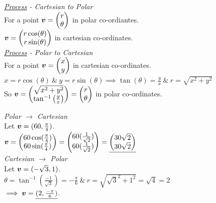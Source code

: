 \documentclass[11pt,a4paper]{article}
\begin{document}
\textit{\underline{Process} - Cartesian to Polar}\\
For a point $\boldsymbol{v} = \begin{pmatrix}r \\ \theta\end{pmatrix}$ in polar co-ordiantes.\\
$\boldsymbol{v} = \begin{pmatrix} r\cos(\theta) \\ r\sin(\theta) \end{pmatrix}$ in cartesian co-ordinates.\\

\textit{\underline{Process} - Polar to Cartesian}\\
For a point $\boldsymbol{v} = \begin{pmatrix} x \\ y \end{pmatrix}$ in cartesian co-ordinates.\\
\-\hspace{2em}$x=r\cos(\theta)\ \& \ y=r\sin(\theta) \implies \tan(\theta) = \frac{y}{x}\ \&\ r = \sqrt{x^2 + y^2}$\\
So $\boldsymbol{v} = \begin{pmatrix} \sqrt{x^2 + y^2} \\ \tan^{-1}\left(\frac{y}{x}\right)\end{pmatrix} = \begin{pmatrix} r \\ \theta \end{pmatrix}$ in polar co-ordinates.\\

\subtitle{Example}
\textit{Polar $\to$ Cartesian}\\
Let $\boldsymbol{v} = (60, \frac{\pi}{4})$.\\
\-\hspace{2em}$\boldsymbol{v} = \begin{pmatrix} 60\cos(\frac{\pi}{4}) \\ 60\sin(\frac{\pi}{4}) \end{pmatrix} = \begin{pmatrix} 60(\frac{1}{\sqrt{2}}) \\ 60(\frac{1}{\sqrt{2}})\end{pmatrix} = \underline{\begin{pmatrix} 30\sqrt{2} \\ 30\sqrt{2} \end{pmatrix}}$\\
\textit{Cartesian $\to$ Polar}\\
Let $\boldsymbol{v} = (-\sqrt{3}, 1)$.\\
\-\hspace{2em}$\theta = \tan^{-1}(\frac{-1}{\sqrt{3}}) = -\frac{\pi}{6}\ \&\ r = \sqrt{\sqrt{3}^2 + 1^2} = \sqrt{4} = 2$\\
$\implies\boldsymbol{v} = \underline{(2, \frac{-\pi}{6})}$.\\
\end{document}
